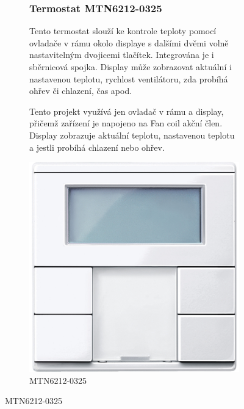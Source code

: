 \documentclass[12pt, a4paper,
twoside,        %
openright
]{report}
\begin{document}
\begin{figure}[h]
\begin{subfigure}{0.9\textwidth}
	\subsubsection{Termostat MTN6212-0325}
	Tento termostat slouží ke kontrole teploty pomocí ovladače v rámu okolo displaye s dalšími dvěmi volně nastavitelným dvojicemi tlačítek. Integrována je i sběrnicová spojka.  Display může zobrazovat aktuální i nastavenou teplotu, rychlost ventilátoru, zda probíhá ohřev či chlazení, čas apod.

	\noindent Tento projekt využívá jen ovladač v rámu a display, přičemž zařízení je napojeno na Fan coil akční člen. Display zobrazuje aktuální teplotu, nastavenou teplotu a jestli probíhá chlazení nebo ohřev.

			\centering
		\centering
		\includegraphics[scale=0.06]{image/MTN6212-0325.jpg}
		\caption{MTN6212-0325}
		\label{image:9}
\end{subfigure}
\end{figure}
\end{document}
